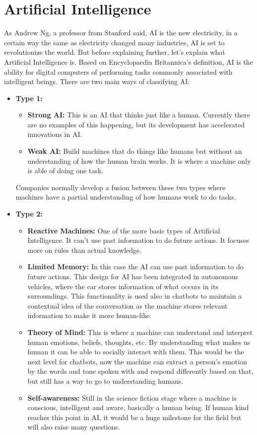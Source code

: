 \section{Artificial Intelligence}\label{sec:chap3_ai}
As Andrew Ng, a professor from Stanford said, AI is the new electricity, in a certain way the same as electricity changed many industries, AI is set to revolutionize the world. But before explaining further, let’s explain what Artificial Intelligence is. Based on Encyclopaedia Britannica’s definition, AI is the ability for digital computers of performing tasks commonly associated with intelligent beings.  There are two main ways of classifying AI:\\
\begin{itemize}
	\item {\textbf{Type 1:}
		\begin{itemize}
			\item {\textbf{Strong AI:} This is an AI that thinks just like a human. Currently there are no examples of this happening, but its development has accelerated innovations in AI.}
			\item {\textbf{Weak AI:} Build machines that do things like humans but without an understanding of how the human brain works. It is where a machine only is able of doing one task.}
		\end{itemize}
	Companies normally develop a fusion between these two types where machines have a partial understanding of how humans work to do tasks.\\
	}
	\item {\textbf{Type 2:}
		\begin{itemize}
			\item {\textbf{Reactive Machines:} One of the more basic types of Artificial Intelligence. It can’t use past information to do future actions. It focuses more on rules than actual knowledge.}
			\item {\textbf{Limited Memory:} In this case the AI can use past information to do future actions. This design for AI has been integrated in autonomous vehicles, where the car stores information of what occurs in its surroundings. This functionality is used also in chatbots to maintain a contextual idea of the conversation as the machine stores relevant information to make it more human-like.}
			\item {\textbf{Theory of Mind:} This is where a machine can understand and interpret human emotions, beliefs, thoughts, etc. By understanding what makes us human it can be able to socially interact with them. This would be the next level for chatbots, now the machine can extract a person’s emotion by the words and tone spoken with and respond differently based on that, but still has a way to go to understanding humans.}
			\item {\textbf{Self-awareness:} Still in the science fiction stage where a machine is conscious, intelligent and aware, basically a human being. If human kind reaches this point in AI, it would be a huge milestone for the field but will also raise many questions.}
		\end{itemize}
	}
\end{itemize}

